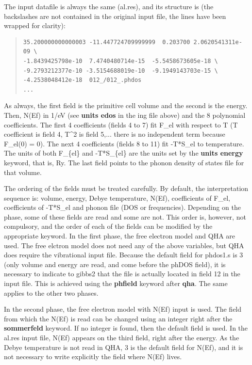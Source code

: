 \documentclass[a4paper]{article}
\begin{document}
The input datafile is always the same (al.res), and its structure is
(the backslashes are not contained in the original input file, the
lines have been wrapped for clarity):
%
\begin{quote}
\begin{verbatim}
35.200000000000003 -11.447724709999999  0.203700 2.0620541311e-09 \
-1.8439425798e-10  7.4740480714e-15  -5.5458673605e-18 \
-9.2793212377e-10 -3.5154688019e-10  -9.1949143703e-15 \
-4.2538048412e-18  012_/012_.phdos
...
\end{verbatim}
\end{quote}

As always, the first field is the primitive cell volume and the second
is the energy. Then, N(Ef) in 1/eV (see \textbf{units edos} in the ing
file above) and the 8 polynomial coefficients. The first 4
coefficients (fields 4 to 7) fit F\_el with respect to T (T coefficient
is field 4, T\textasciicircum{}2 is field 5,... there is no independent term because
F\_el(0) = 0). The next 4 coefficients (fields 8 to 11) fit -T*S\_el to
temperature. The units of both F\_\{el\} and -T*S\_\{el\} are the units set
by the \textbf{units energy} keyword, that is, Ry. The last field points to
the phonon density of states file for that volume.

The ordering of the fields must be treated carefully. By default, the
interpretation sequence is: volume, energy, Debye temperature, N(Ef),
coefficients of F\_el, coefficients of -T*S\_el and phonon file (DOS or
frequencies). Depending on the phase, some of these fields are read
and some are not. This order is, however, not compulsory, and the
order of each of the fields can be modified by the appropriate
keyword. In the first phase, the free electron model and QHA are
used. The free elctron model does not need any of the above variables,
but QHA does require the vibrational input file. Because the default
field for phdos1.s is 3 (only volume and energy are read, and come
before the phDOS field), it is necessary to indicate to gibbs2 that
the file is actually located in field 12 in the input file. This is
achieved using the \textbf{phfield} keyword after \textbf{qha}. The same applies
to the other two phases.

In the second phase, the free electron model with N(Ef) input is
used. The field from which the N(Ef) is read can be changed using an
integer right after the \textbf{sommerfeld} keyword. If no integer is
found, then the default field is used. In the al.res input file, N(Ef)
appears on the third field, right after the energy. As the Debye
temperature is not read in QHA, 3 is the default field for N(Ef), and
it is not necessary to write explicitly the field where N(Ef) lives.
\end{document}
